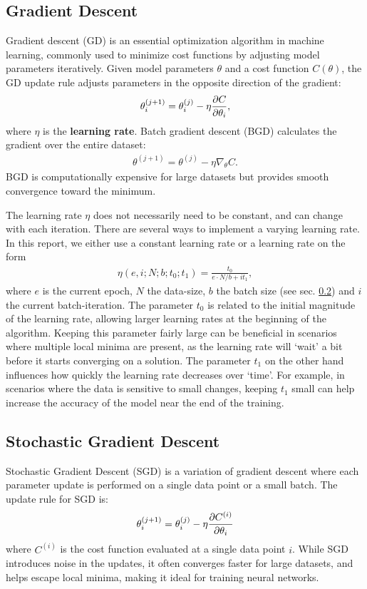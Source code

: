 \documentclass[%
reprint,s
amsmath,amssymb,
aps,
]{revtex4-2}
\begin{document}
\subsection{Gradient Descent}	\label{sec:gradient_descent}
Gradient descent (GD) is an essential optimization algorithm in machine learning, commonly used to minimize cost functions by adjusting model parameters iteratively. Given model parameters $\theta$ and a cost function $C(\theta)$, the GD update rule adjusts parameters in the opposite direction of the gradient:
\begin{align}
	\theta_i^{(j+1)}=\theta_i^{(j)}-\eta\pdv{C}{\theta_i},
\end{align}
where $\eta$ is the \textbf{learning rate}. Batch gradient descent (BGD) calculates the gradient over the entire dataset:
\begin{align}
	\theta^{(j+1)}=\theta^{(j)}-\eta\nabla_\theta C.
\end{align}
BGD is computationally expensive for large datasets but provides smooth convergence toward the minimum.

The learning rate \(\eta\) does not necessarily need to be constant, and can change with each iteration. There are several ways to implement a varying learning rate. In this report, we either use a constant learning rate or a learning rate on the form 
\begin{align} \label{eq:varyin_learning_rate}
	\eta(e,i;N;b;t_0;t_1) = \frac{t_0}{e\cdot N/b + i t_1},
\end{align}
where \(e\) is the current epoch, \(N\) the data-size, \(b\) the batch size (see sec. \ref{sec:stochastic_gradient_descent}) and \(i\) the current batch-iteration. The parameter \(t_0\) is related to the initial magnitude of the learning rate, allowing larger learning rates at the beginning of the algorithm. Keeping this parameter fairly large can be beneficial in scenarios where multiple local minima are present, as the learning rate will `wait' a bit before it starts converging on a solution. The parameter \(t_1\) on the other hand influences how quickly the learning rate decreases over `time'. For example, in scenarios where the data is sensitive to small changes, keeping \(t_1\) small can help increase the accuracy of the model near the end of the training. 

\subsection{Stochastic Gradient Descent} \label{sec:stochastic_gradient_descent}
Stochastic Gradient Descent (SGD) is a variation of gradient descent where each parameter update is performed on a single data point or a small batch. The update rule for SGD is:
\[
\theta_i^{(j+1)} = \theta_i^{(j)} - \eta \pdv{C^{(i)}}{\theta_i}
\]
where $C^{(i)}$ is the cost function evaluated at a single data point $i$. While SGD introduces noise in the updates, it often converges faster for large datasets, and helps escape local minima, making it ideal for training neural networks.
\end{document}
